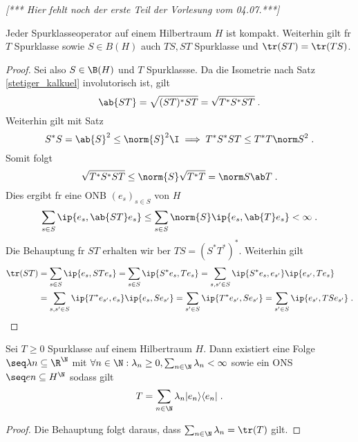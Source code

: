 \textit{[*** Hier fehlt noch der erste Teil der Vorlesung vom 04.07.***]}
\begin{theorem}
	Jeder Spurklasseoperator auf einem Hilbertraum $H$ ist kompakt. Weiterhin gilt f\us r $T$ Spurklasse sowie \(S \in B(H)\) auch \(TS, ST\) Spurklasse und \(\tr (ST) = \tr(TS)\).
\end{theorem}
\begin{proof}
	Sei also \(S\in \B(H)\) und $T$ Spurklassse.  Da die Isometrie nach Satz \ref{stetiger_kalkuel} involutorisch ist, gilt
	\[\ab{ST} = \sqrt{(ST)^*ST} = \sqrt{T^*S^*ST}\;.\]
	Weiterhin gilt mit Satz 
	\[S^*S = \ab{S}^2  \leq \norm{S}^2 \I \implies T^* S^* ST \leq T^*T\norm S^2 \;.\]
	Somit folgt
	\[\sqrt{T^*S^*ST} \leq \norm{S} \sqrt{T^*T} = \norm S \ab T\;.\]	
	Dies ergibt f\us r eine ONB \((e_s)_{s\in S}\) von $H$
	\[\sum_{s\in S}\ip{e_s, \ab{ST} e_s} \leq \sum_{s\in S} \norm{S} \ip{e_s, \ab{T}e_s} < \infty\;.\]
	Die Behauptung f\us r $ST$ erhalten wir \us ber \(TS = (S^*T^*)^*\). Weiterhin gilt
	\begin{align*}\tr(ST) &= \sum_{s\in S} \ip{e_s, ST e_s} = \sum_{s\in S} \ip {S^* e_s, T e_s} = \sum_{s, s' \in S}\ip{S^* e_s, e_{s'}}\ip{e_{s'}, Te_s} \\
		&= \sum_{s, s' \in S}\ip{T^* e_{s'}, e_s}\ip{e_s, Se_{s'}} = \sum_{s'\in S} \ip{T^* e_{s'}, S e_{s'}} = \sum_{s'\in S} \ip {e_{s'}, TS e_{s'}}\;.
		\end{align*}
\end{proof}
\begin{theorem}
	Sei \(T\geq 0\) Spurklasse auf einem Hilbertraum $H$. Dann existiert eine Folge \(\seq \lambda n \subseteq \R^\N\) mit \( \forall n\in\N: \lambda_n \geq 0, \sum_{n\in\N} \lambda_n <\infty\) sowie ein ONS \(\seq en \subseteq H^\N\) sodass gilt
	\[ T = \sum_{n\in\N} \lambda_n|e_n\rangle \langle e_n|\;.\]
\end{theorem}
\begin{proof}
	Die Behauptung folgt daraus, dass \(\sum_{n\in\N} \lambda_n = \tr(T)\) gilt.
\end{proof}